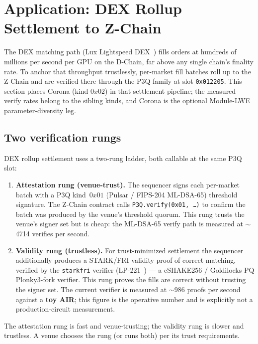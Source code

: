\section{Application: DEX Rollup Settlement to Z-Chain}
\label{sec:dex-rollup}

The DEX matching path (Lux Lightspeed DEX~\cite{luxlightspeeddex}) fills
orders at hundreds of millions per second per GPU on the D-Chain, far
above any single chain's finality rate. To anchor that throughput
trustlessly, per-market fill batches roll up to the Z-Chain and are
verified there through the P3Q family at slot \texttt{0x012205}. This
section places Corona (kind $0x02$) in that settlement pipeline; the
measured verify rates belong to the sibling kinds, and Corona is the
optional Module-LWE parameter-diversity leg.

\subsection{Two verification rungs}

DEX rollup settlement uses a two-rung ladder, both callable at the same
P3Q slot:

\begin{enumerate}[leftmargin=2em,nosep]
  \item \textbf{Attestation rung (venue-trust).} The sequencer signs each
    per-market batch with a P3Q kind~$0x01$ (Pulsar / FIPS-204 ML-DSA-65)
    threshold signature. The Z-Chain contract calls
    \texttt{P3Q.verify(0x01, \ldots)} to confirm the batch was produced
    by the venue's threshold quorum. This rung trusts the venue's signer
    set but is cheap: the ML-DSA-65 verify path is measured at
    $\sim$\num{4714} verifies per second.
  \item \textbf{Validity rung (trustless).} For trust-minimized
    settlement the sequencer additionally produces a STARK/FRI validity
    proof of correct matching, verified by the \texttt{starkfri} verifier
    (LP-221~\cite{lp221}) --- a cSHAKE256 / Goldilocks PQ Plonky3-fork
    verifier. This rung proves the fills are correct without trusting the
    signer set. The current verifier is measured at $\sim$\num{986}
    proofs per second against a \textbf{toy AIR}; this figure is the
    operative number and is explicitly not a production-circuit
    measurement.
\end{enumerate}

The attestation rung is fast and venue-trusting; the validity rung is
slower and trustless. A venue chooses the rung (or runs both) per its
trust requirements.

